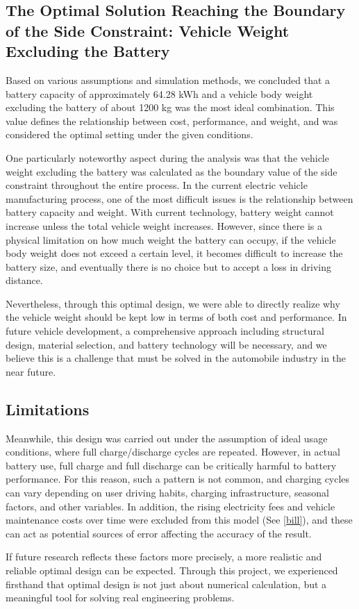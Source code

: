 \documentclass[11pt,twocolumn]{article}
\begin{document}
        \subsection{The Optimal Solution Reaching the Boundary of the Side Constraint: Vehicle Weight Excluding the Battery}
            Based on various assumptions and simulation methods, we concluded that a battery capacity of approximately 64.28 kWh and a vehicle body weight excluding the battery of about 1200 kg was the most ideal combination.
            This value defines the relationship between cost, performance, and weight, and was considered the optimal setting under the given conditions.
            \par
            One particularly noteworthy aspect during the analysis was that the vehicle weight excluding the battery was calculated as the boundary value of the side constraint throughout the entire process.
            In the current electric vehicle manufacturing process, one of the most difficult issues is the relationship between battery capacity and weight.
            With current technology, battery weight cannot increase unless the total vehicle weight increases.
            However, since there is a physical limitation on how much weight the battery can occupy, if the vehicle body weight does not exceed a certain level, it becomes difficult to increase the battery size, and eventually there is no choice but to accept a loss in driving distance.
            \par
            Nevertheless, through this optimal design, we were able to directly realize why the vehicle weight should be kept low in terms of both cost and performance.
            In future vehicle development, a comprehensive approach including structural design, material selection, and battery technology will be necessary, and we believe this is a challenge that must be solved in the automobile industry in the near future.
        \subsection{Limitations}
            Meanwhile, this design was carried out under the assumption of ideal usage conditions, where full charge/discharge cycles are repeated.
            However, in actual battery use, full charge and full discharge can be critically harmful to battery performance.
            For this reason, such a pattern is not common, and charging cycles can vary depending on user driving habits, charging infrastructure, seasonal factors, and other variables.
            In addition, the rising electricity fees and vehicle maintenance costs over time were excluded from this model (See \cref{bill}), and these can act as potential sources of error affecting the accuracy of the result.
            \par
            If future research reflects these factors more precisely, a more realistic and reliable optimal design can be expected.
            Through this project, we experienced firsthand that optimal design is not just about numerical calculation, but a meaningful tool for solving real engineering problems.
\end{document}
